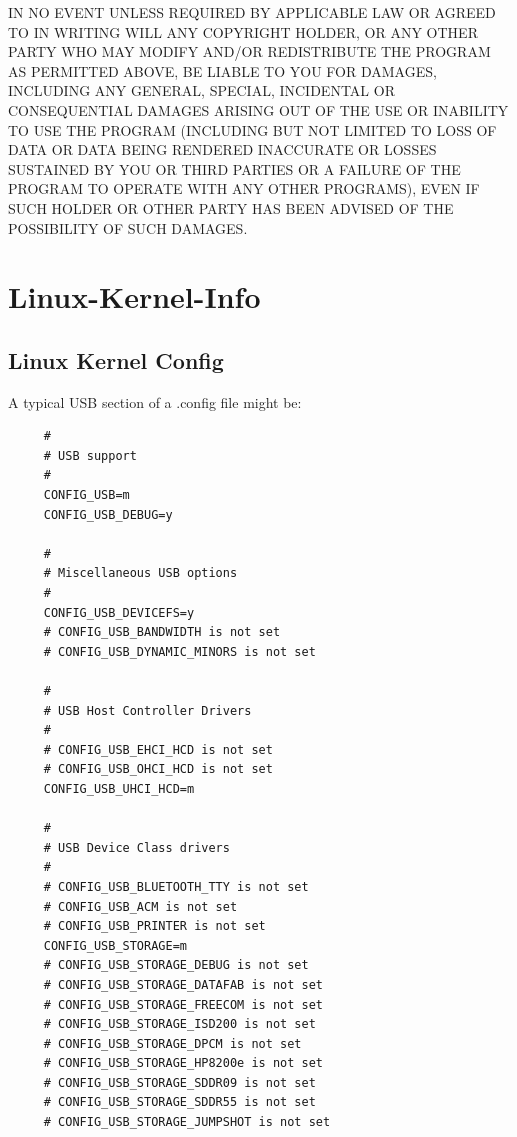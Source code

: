 {{{{{{{{{IN NO EVENT UNLESS REQUIRED BY APPLICABLE LAW OR AGREED TO IN WRITING WILL ANY
COPYRIGHT HOLDER, OR ANY OTHER PARTY WHO MAY MODIFY AND/OR REDISTRIBUTE THE
PROGRAM AS PERMITTED ABOVE, BE LIABLE TO YOU FOR DAMAGES, INCLUDING ANY
GENERAL, SPECIAL, INCIDENTAL OR CONSEQUENTIAL DAMAGES ARISING OUT OF THE USE
OR INABILITY TO USE THE PROGRAM (INCLUDING BUT NOT LIMITED TO LOSS OF DATA OR
DATA BEING RENDERED INACCURATE OR LOSSES SUSTAINED BY YOU OR THIRD PARTIES OR
A FAILURE OF THE PROGRAM TO OPERATE WITH ANY OTHER PROGRAMS), EVEN IF SUCH
HOLDER OR OTHER PARTY HAS BEEN ADVISED OF THE POSSIBILITY OF SUCH DAMAGES. 

\label{Linux-Kernel-Info}
\section*{Linux-Kernel-Info}

\subsection*{Linux Kernel Config}
\label{Linux-Kernel-Config}

A typical USB section of a .config file might be:  

\label{index-Kernel-config-265}
\label{index-config_002c-Kernel-266}

\footnotesize
\begin{verbatim}
     #
     # USB support
     #
     CONFIG_USB=m
     CONFIG_USB_DEBUG=y
     
     #
     # Miscellaneous USB options
     #
     CONFIG_USB_DEVICEFS=y
     # CONFIG_USB_BANDWIDTH is not set
     # CONFIG_USB_DYNAMIC_MINORS is not set
     
     #
     # USB Host Controller Drivers
     #
     # CONFIG_USB_EHCI_HCD is not set
     # CONFIG_USB_OHCI_HCD is not set
     CONFIG_USB_UHCI_HCD=m
     
     #
     # USB Device Class drivers
     #
     # CONFIG_USB_BLUETOOTH_TTY is not set
     # CONFIG_USB_ACM is not set
     # CONFIG_USB_PRINTER is not set
     CONFIG_USB_STORAGE=m
     # CONFIG_USB_STORAGE_DEBUG is not set
     # CONFIG_USB_STORAGE_DATAFAB is not set
     # CONFIG_USB_STORAGE_FREECOM is not set
     # CONFIG_USB_STORAGE_ISD200 is not set
     # CONFIG_USB_STORAGE_DPCM is not set
     # CONFIG_USB_STORAGE_HP8200e is not set
     # CONFIG_USB_STORAGE_SDDR09 is not set
     # CONFIG_USB_STORAGE_SDDR55 is not set
     # CONFIG_USB_STORAGE_JUMPSHOT is not set
     

\end{verbatim}}}}}}}}}}
